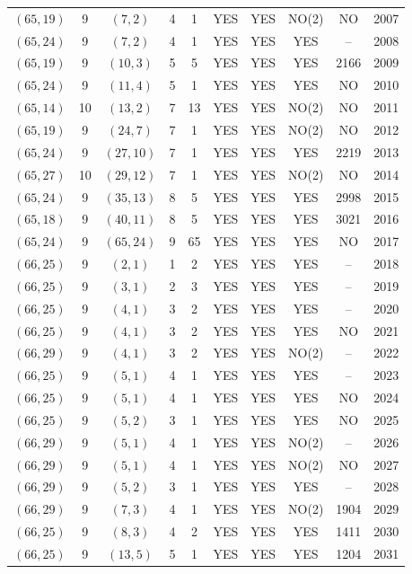 \begin{longtable}{|c|c|c|c|c|c|c|c|c|c|}
$(65, 19)$ & 9 & $(7, 2)$ & 4 & 1 & YES & YES & NO(2) & NO & 2007\\
$(65, 24)$ & 9 & $(7, 2)$ & 4 & 1 & YES & YES & YES & -- & 2008\\
$(65, 19)$ & 9 & $(10, 3)$ & 5 & 5 & YES & YES & YES & 2166 & 2009\\
$(65, 24)$ & 9 & $(11, 4)$ & 5 & 1 & YES & YES & YES & NO & 2010\\
$(65, 14)$ & 10 & $(13, 2)$ & 7 & 13 & YES & YES & NO(2) & NO & 2011\\
$(65, 19)$ & 9 & $(24, 7)$ & 7 & 1 & YES & YES & NO(2) & NO & 2012\\
$(65, 24)$ & 9 & $(27, 10)$ & 7 & 1 & YES & YES & YES & 2219 & 2013\\
$(65, 27)$ & 10 & $(29, 12)$ & 7 & 1 & YES & YES & NO(2) & NO & 2014\\
$(65, 24)$ & 9 & $(35, 13)$ & 8 & 5 & YES & YES & YES & 2998 & 2015\\
$(65, 18)$ & 9 & $(40, 11)$ & 8 & 5 & YES & YES & YES & 3021 & 2016\\
$(65, 24)$ & 9 & $(65, 24)$ & 9 & 65 & YES & YES & YES & NO & 2017\\
$(66, 25)$ & 9 & $(2, 1)$ & 1 & 2 & YES & YES & YES & -- & 2018\\
$(66, 25)$ & 9 & $(3, 1)$ & 2 & 3 & YES & YES & YES & -- & 2019\\
$(66, 25)$ & 9 & $(4, 1)$ & 3 & 2 & YES & YES & YES & -- & 2020\\
$(66, 25)$ & 9 & $(4, 1)$ & 3 & 2 & YES & YES & YES & NO & 2021\\
$(66, 29)$ & 9 & $(4, 1)$ & 3 & 2 & YES & YES & NO(2) & -- & 2022\\
$(66, 25)$ & 9 & $(5, 1)$ & 4 & 1 & YES & YES & YES & -- & 2023\\
$(66, 25)$ & 9 & $(5, 1)$ & 4 & 1 & YES & YES & YES & NO & 2024\\
$(66, 25)$ & 9 & $(5, 2)$ & 3 & 1 & YES & YES & YES & NO & 2025\\
$(66, 29)$ & 9 & $(5, 1)$ & 4 & 1 & YES & YES & NO(2) & -- & 2026\\
$(66, 29)$ & 9 & $(5, 1)$ & 4 & 1 & YES & YES & NO(2) & NO & 2027\\
$(66, 29)$ & 9 & $(5, 2)$ & 3 & 1 & YES & YES & YES & -- & 2028\\
$(66, 29)$ & 9 & $(7, 3)$ & 4 & 1 & YES & YES & NO(2) & 1904 & 2029\\
$(66, 25)$ & 9 & $(8, 3)$ & 4 & 2 & YES & YES & YES & 1411 & 2030\\
$(66, 25)$ & 9 & $(13, 5)$ & 5 & 1 & YES & YES & YES & 1204 & 2031\\

\end{longtable}
